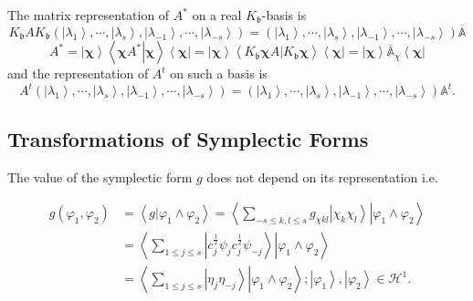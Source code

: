 \documentclass[aps,preprint]{revtex4}%
\begin{document}
The matrix representation of $A^{\ast}$ on a real $K_{\mathfrak{b}}$-basis is
\begin{equation}
K_{\mathfrak{b}}AK_{\mathfrak{b}}\left(  \left\vert \lambda_{1}\right\rangle
,\cdots,\left\vert \lambda_{s}\right\rangle ,\left\vert \lambda_{-1}%
\right\rangle ,\cdots,\left\vert \lambda_{-s}\right\rangle \right)  =\left(
\left\vert \lambda_{1}\right\rangle ,\cdots,\left\vert \lambda_{s}%
\right\rangle ,\left\vert \lambda_{-1}\right\rangle ,\cdots,\left\vert
\lambda_{-s}\right\rangle \right)  \overline{\mathbb{A}}%
\end{equation}%
\begin{equation}
A^{\ast}=\left\vert \mathbf{\chi}\right\rangle \left\langle \mathbf{\chi
}\left.  A^{\ast}\right\vert \mathbf{\chi}\right\rangle \left\langle
\mathbf{\chi}\right\vert =\left\vert \mathbf{\chi}\right\rangle \left\langle
K_{\mathfrak{b}}\mathbf{\chi}\left.  A\right\vert K_{\mathfrak{b}}%
\mathbf{\chi}\right\rangle \left\langle \mathbf{\chi}\right\vert =\left\vert
\mathbf{\chi}\right\rangle \overline{\mathbb{A}}_{\chi}\left\langle
\mathbf{\chi}\right\vert
\end{equation}
and the representation of $A^{t}$ on such a basis is
\begin{equation}
A^{t}\left(  \left\vert \lambda_{1}\right\rangle ,\cdots,\left\vert
\lambda_{s}\right\rangle ,\left\vert \lambda_{-1}\right\rangle ,\cdots
,\left\vert \lambda_{-s}\right\rangle \right)  =\left(  \left\vert \lambda
_{1}\right\rangle ,\cdots,\left\vert \lambda_{s}\right\rangle ,\left\vert
\lambda_{-1}\right\rangle ,\cdots,\left\vert \lambda_{-s}\right\rangle
\right)  \mathbb{A}^{t}.
\end{equation}


\subsection{Transformations of Symplectic Forms}

The value of the symplectic form $g$ does not depend on its representation i.e.%

\begin{align}
g\left(  \varphi_{1},\varphi_{2}\right)   &  =\left\langle \left.
g\right\vert \varphi_{1}\wedge\varphi_{2}\right\rangle =\left\langle \left.
\sum_{-s\leq k,l\leq s}g_{\chi kl}\left\vert \chi_{k}\chi_{l}\right\rangle
\right\vert \varphi_{1}\wedge\varphi_{2}\right\rangle \nonumber\\
&  =\left\langle \left.  \sum_{1\leq j\leq s}\left\vert c_{j}^{\frac{1}{2}%
}\psi_{j}c_{j}^{\frac{1}{2}}\psi_{-j}\right\rangle \right\vert \varphi
_{1}\wedge\varphi_{2}\right\rangle \nonumber\\
&  =\left\langle \left.  \sum_{1\leq j\leq s}\left\vert \eta_{j}\eta
_{-j}\right\rangle \right\vert \varphi_{1}\wedge\varphi_{2}\right\rangle
;\left\vert \varphi_{1}\right\rangle ,\left\vert \varphi_{2}\right\rangle
\in\mathcal{H}^{1}.
\end{align}
\end{document}
